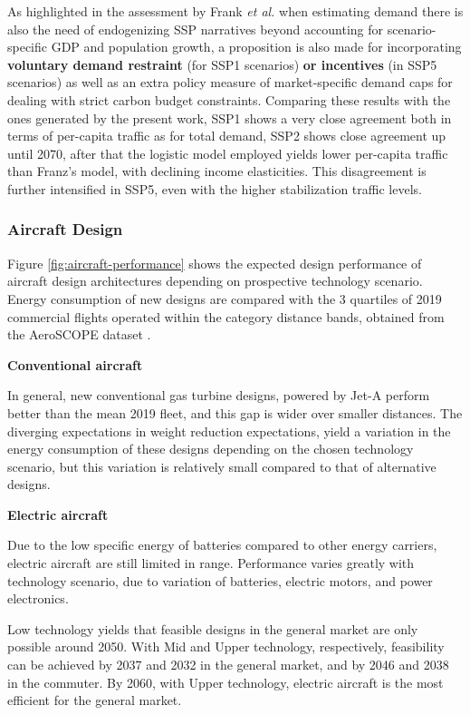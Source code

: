 \documentclass[a4paper,fleqn]{cas-dc}
\begin{document}
As highlighted in the assessment by Frank \textit{et al.} \cite{franz_wide_2022} when estimating demand there is also the need of endogenizing SSP narratives beyond accounting for scenario-specific GDP and population growth, a proposition is also made for incorporating \textbf{voluntary demand restraint} (for SSP1 scenarios) \textbf{or incentives} (in SSP5 scenarios) as well as an extra policy measure of market-specific demand caps for dealing with strict carbon budget constraints. Comparing these results with the ones generated by the present work, SSP1 shows a very close agreement both in terms of per-capita traffic as for total demand, SSP2 shows close agreement up until 2070, after that the logistic model employed yields lower per-capita traffic than Franz's model, with declining income elasticities. This disagreement is further intensified in SSP5, even with the higher stabilization traffic levels.

\subsubsection{Aircraft Design}

Figure \ref{fig:aircraft-performance} shows the expected design performance of aircraft design architectures depending on prospective technology scenario. Energy consumption of new designs are compared with the 3 quartiles of 2019 commercial flights operated within the category distance bands, obtained from the AeroSCOPE dataset \cite{salgas_aeroscope}.

\textbf{Conventional aircraft}

In general, new conventional gas turbine designs, powered by Jet-A perform better than the mean 2019 fleet, and this gap is wider over smaller distances. The diverging expectations in weight reduction expectations, yield a variation in the energy consumption of these designs depending on the chosen technology scenario, but this variation is relatively small compared to that of alternative designs.

\textbf{Electric aircraft}

Due to the low specific energy of batteries compared to other energy carriers, electric aircraft are still limited in range. Performance varies greatly with technology scenario, due to variation of batteries, electric motors, and power electronics.

Low technology yields that feasible designs in the general market are only possible around 2050. With Mid and Upper technology, respectively, feasibility can be achieved by 2037 and 2032 in the general market, and by 2046 and 2038 in the commuter. By 2060, with Upper technology, electric aircraft is the most efficient for the general market.
\end{document}
